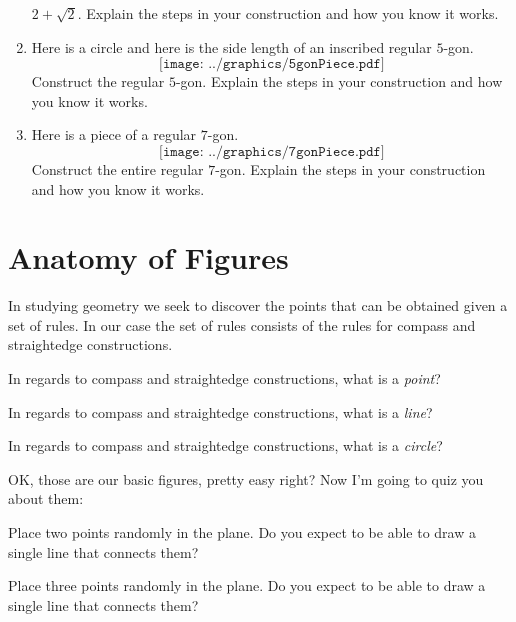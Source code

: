 \begin{problems}
\begin{enumerate}
  $2 + \sqrt{2}$. Explain the steps in your construction and how you know it works.
\item Here is a circle and here is the side length of an inscribed
  regular $5$-gon.
\[
\texttt{[image: ../graphics/5gonPiece.pdf]}
\]
Construct the regular $5$-gon. Explain the steps in your construction and how you know it works.
\item Here is a piece of a regular $7$-gon.
\[
\texttt{[image: ../graphics/7gonPiece.pdf]}
\]
Construct the entire regular $7$-gon. Explain the steps in your
construction and how you know it works.
\end{enumerate}
\end{problems}

\newpage



\section{Anatomy of Figures}


In studying geometry we seek to discover the points that can be
obtained given a set of rules. In our case the set of rules consists
of the rules for compass and straightedge constructions.

\begin{question} 
In regards to compass and straightedge constructions, what is a
\textit{point}?
\end{question}
\QM

\begin{question}
In regards to compass and straightedge constructions, what is a
\textit{line}?
\end{question}
\QM


\begin{question}
In regards to compass and straightedge constructions, what is a
\textit{circle}?
\end{question}
\QM


OK, those are our basic figures, pretty easy right? Now I'm going to
quiz you about them:

\begin{question} 
Place two points randomly in the plane. Do you expect to be able to
draw a single line that connects them?
\end{question}
\QM

\begin{question} 
Place three points randomly in the plane. Do you expect to be able to
draw a single line that connects them?
\end{question}
\QM

